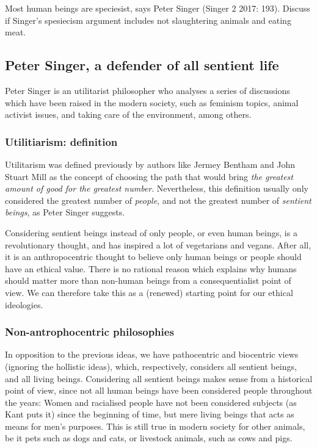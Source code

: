 \documentclass{myassignment}
\begin{document}
	\begin{problem}
		Most human beings are speciesist, says Peter Singer (Singer 2 2017: 193). Discuss if Singer’s spesiecism argument includes not slaughtering animals and eating meat.%
	\end{problem}%

	\begin{answer}
		\section*{Peter Singer, a defender of all sentient life}%
		
		Peter Singer is an utilitarist philosopher who analyses a series of discussions which have been raised in the modern society, such as feminism topics, animal activist issues, and taking care of the environment, among others.

		\subsubsection*{Utilitiarism: definition}%
		
		Utilitarism was defined previously by authors like Jermey Bentham and John Stuart Mill as the concept of choosing the path that would bring \emph{the greatest amount of good for the greatest number}. Nevertheless, this definition usually only considered the greatest number of \emph{people}, and not the greatest number of \emph{sentient beings}, as Peter Singer suggests.

		Considering sentient beings instead of only people, or even human beings, is a revolutionary thought, and has inspired a lot of vegetarians and vegans. After all, it is an anthropocentric thought to believe only human beings or people should have an ethical value. There is no rational reason which explains why humans should matter more than non-human beings from a consequentialist point of view. We can therefore take this as a (renewed) starting point for our ethical ideologies.

		\subsubsection*{Non-antrophocentric philosophies}%
		
		In opposition to the previous ideas, we have pathocentric and biocentric views (ignoring the hollistic ideas), which, respectively, considers all sentient beings, and all living beings. Considering all sentient beings makes sense from a historical point of view, since not all human beings have been considered people throughout the years: Women and racialised people have not been considered subjects (as Kant puts it) since the beginning of time, but mere living beings that acts as means for men's purposes. This is still true in modern society for other animals, be it pets such as dogs and cats, or livestock animals, such as cows and pigs. 


\end{answer}
\end{document}
